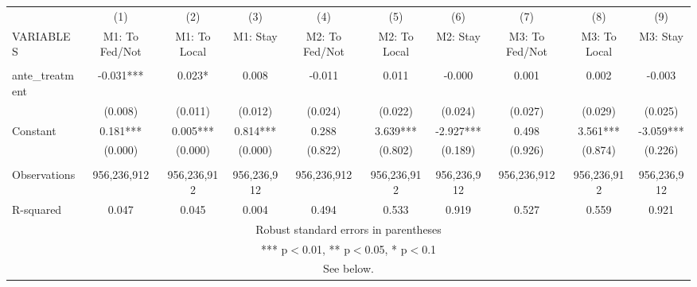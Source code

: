 \begin{tabular}{lccccccccc} \hline
 & (1) & (2) & (3) & (4) & (5) & (6) & (7) & (8) & (9) \\
VARIABLES & M1: To Fed/Not & M1: To Local & M1: Stay & M2: To Fed/Not & M2: To Local & M2: Stay & M3: To Fed/Not & M3: To Local & M3: Stay \\ \hline
 &  &  &  &  &  &  &  &  &  \\
ante\_treatment & -0.031*** & 0.023* & 0.008 & -0.011 & 0.011 & -0.000 & 0.001 & 0.002 & -0.003 \\
 & (0.008) & (0.011) & (0.012) & (0.024) & (0.022) & (0.024) & (0.027) & (0.029) & (0.025) \\
Constant & 0.181*** & 0.005*** & 0.814*** & 0.288 & 3.639*** & -2.927*** & 0.498 & 3.561*** & -3.059*** \\
 & (0.000) & (0.000) & (0.000) & (0.822) & (0.802) & (0.189) & (0.926) & (0.874) & (0.226) \\
 &  &  &  &  &  &  &  &  &  \\
Observations & 956,236,912 & 956,236,912 & 956,236,912 & 956,236,912 & 956,236,912 & 956,236,912 & 956,236,912 & 956,236,912 & 956,236,912 \\
 R-squared & 0.047 & 0.045 & 0.004 & 0.494 & 0.533 & 0.919 & 0.527 & 0.559 & 0.921 \\ \hline
\multicolumn{10}{c}{ Robust standard errors in parentheses} \\
\multicolumn{10}{c}{ *** p$<$0.01, ** p$<$0.05, * p$<$0.1} \\
\multicolumn{10}{c}{ See below.} \\
\end{tabular}
